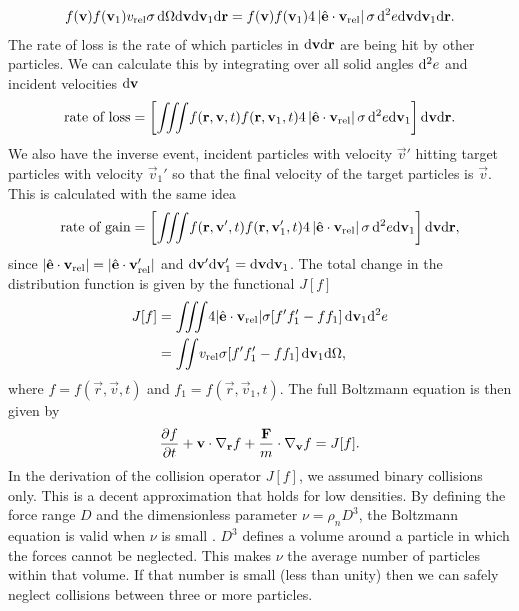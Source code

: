 \begin{align}
	f(\mathbf v)f(\mathbf v_1) v_\text{rel} \sigma \, \mathrm{d}\Omega \mathrm{d}\mathbf v \mathrm{d}\mathbf v_1 \mathrm{d}\mathbf r = f(\mathbf v)f(\mathbf v_1)4\left|\hat {\mathbf{e}}\cdot \mathbf v_\text{rel}\right| \sigma \,\mathrm{d}^2e \mathrm{d}\mathbf v \mathrm{d}\mathbf v_1 \mathrm{d}\mathbf r.
\end{align}
The rate of loss is the rate of which particles in $\mathrm{d}\mathbf v\mathrm{d}\mathbf r$ are being hit by other particles. We can calculate this by integrating over all solid angles $\mathrm{d}^2 e$ and incident velocities $\mathrm{d}\mathbf v$
\begin{align}
	\text{rate of loss} = \left[\iiint\! f(\mathbf r, \mathbf v, t)f(\mathbf r, \mathbf v_1, t)4\left|\hat {\mathbf{e}} \cdot \mathbf v_\text{rel} \right|\sigma \,\mathrm{d}^2 e\mathrm{d}\mathbf v_1\right]\mathrm{d}\mathbf v\mathrm{d}\mathbf r.
\end{align}
We also have the inverse event, incident particles with velocity $\vec v'$ hitting target particles with velocity $\vec v_1'$ so that the final velocity of the target particles is $\vec v$. This is calculated with the same idea
\begin{align}
	\text{rate of gain} = \left[\iiint\! f(\mathbf r, \mathbf v', t)f(\mathbf r, \mathbf v_1', t)4\left|\hat {\mathbf{e}} \cdot \mathbf v_\text{rel} \right|\sigma \,\mathrm{d}^2 e\mathrm{d}\mathbf v_1\right]\mathrm{d}\mathbf v\mathrm{d}\mathbf r,
\end{align}
since $|\hat {\mathbf{e}}\cdot \mathbf v_\text{rel}| = |\hat {\mathbf{e}}\cdot \mathbf v_\text{rel}'|$ and $\mathrm{d}\mathbf v'\mathrm{d}\mathbf v_1' = \mathrm{d}\mathbf v\mathrm{d}\mathbf v_1$. The total change in the distribution function is given by the functional $J[f]$
\begin{align}
	J[f] &= \iiint\! 4|\hat {\mathbf{e}}\cdot\mathbf v_\text{rel}|\sigma[f'f_1' - ff_1]\,\mathrm{d}\mathbf v_1 \mathrm{d}^2e\\
	&= \iint\! v_\text{rel} \sigma[f'f_1' - ff_1] \,\mathrm{d}\mathbf v_1 \mathrm{d}\Omega,
\end{align}
where $f = f(\vec r, \vec v, t)$ and $f_1 = f(\vec r, \vec v_1, t)$. The full Boltzmann equation is then given by
\begin{align}
	\label{eq:boltzmann_equation}
	\frac{\partial f}{\partial t} + \mathbf v\cdot \nabla_\mathbf r f + \frac{\mathbf F}{m}\cdot\nabla_\mathbf v f = J[f].
\end{align}
In the derivation of the collision operator $J[f]$, we assumed binary collisions only. This is a decent approximation that holds for low densities. By defining the force range $D$ and the dimensionless parameter $\nu = \rho_n D^3$, the Boltzmann equation is valid when $\nu$ is small \cite{mclennan1989introduction}. $D^3$ defines a volume around a particle in which the forces cannot be neglected. This makes $\nu$ the average number of particles within that volume. If that number is small (less than unity) then we can safely neglect collisions between three or more particles.
